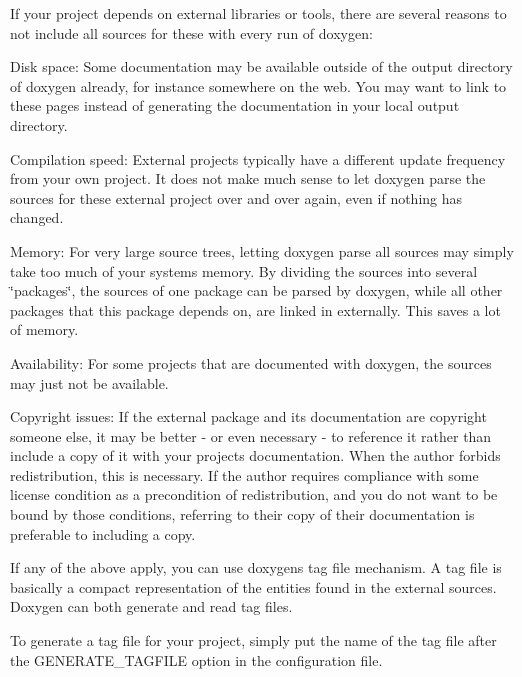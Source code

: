 If your project depends on external libraries or tools, there are several reasons to not include all sources for these with every run of doxygen\+:


\begin{DoxyDescription}
\item[Disk space\+:]Some documentation may be available outside of the output directory of doxygen already, for instance somewhere on the web. You may want to link to these pages instead of generating the documentation in your local output directory. 
\item[Compilation speed\+:]External projects typically have a different update frequency from your own project. It does not make much sense to let doxygen parse the sources for these external project over and over again, even if nothing has changed. 
\item[Memory\+:]For very large source trees, letting doxygen parse all sources may simply take too much of your system\textquotesingle{}s memory. By dividing the sources into several \char`\"{}packages\char`\"{}, the sources of one package can be parsed by doxygen, while all other packages that this package depends on, are linked in externally. This saves a lot of memory. 
\item[Availability\+:]For some projects that are documented with doxygen, the sources may just not be available. 
\item[Copyright issues\+:]If the external package and its documentation are copyright someone else, it may be better -\/ or even necessary -\/ to reference it rather than include a copy of it with your project\textquotesingle{}s documentation. When the author forbids redistribution, this is necessary. If the author requires compliance with some license condition as a precondition of redistribution, and you do not want to be bound by those conditions, referring to their copy of their documentation is preferable to including a copy.


\end{DoxyDescription}

If any of the above apply, you can use doxygen\textquotesingle{}s tag file mechanism. A tag file is basically a compact representation of the entities found in the external sources. Doxygen can both generate and read tag files.

To generate a tag file for your project, simply put the name of the tag file after the G\+E\+N\+E\+R\+A\+T\+E\+\_\+\+T\+A\+G\+F\+I\+LE option in the configuration file.

